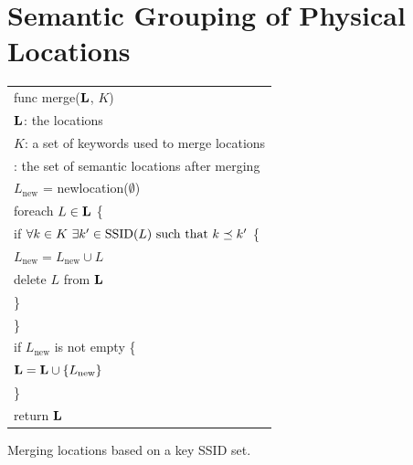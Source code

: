 \section{Semantic Grouping of Physical Locations}
\label{sec:semantic}

\begin{algorithm}[t]
    \centering
    \begin{tabular}{|l|} \hline
        func merge($\mathbf{L}$, $K$) \\
        \RRR $\mathbf{L}$: the locations \\
        \RRR $K$: a set of keywords used to merge locations \\
        \RRR {\em returns}: the set of semantic locations after merging\\ \hline
        $L_\mathrm{new}$ = newlocation($\emptyset$)\\
        foreach $L\in\mathbf{L}$ \{ \\
            \RRR if $\forall k\in K\ \exists k'\in\mathrm{SSID}(L)\ \mathrm{such\ that}\ k\preceq k'$ \{ \\
            \RRR \RRR $L_\mathrm{new} = L_\mathrm{new}\cup L$ \\
            \RRR \RRR delete $L$ from $\mathbf{L}$ \\
            \RRR \} \\
        \} \\
        if $L_\mathrm{new}$ is not empty \{ \\
        \RRR $\mathbf{L} = \mathbf{L}\cup\{L_\mathrm{new}\}$ \\
        \} \\
        return $\mathbf{L}$ \\ \hline
    \end{tabular}
    \vspace{0.4cm}
    \caption{Merging locations based on a key SSID set.}
    \label{alg:merge}
\end{algorithm}

